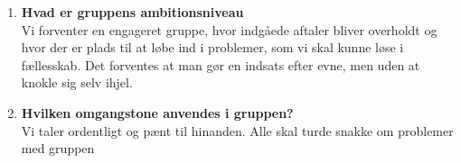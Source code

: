 \begin{enumerate}
	\item \textbf{Hvad er gruppens ambitionsniveau} \\
	Vi forventer en engageret gruppe, hvor indgåede aftaler bliver overholdt og hvor der er plads til at løbe ind i problemer, som vi skal kunne løse i fællesskab.
	Det forventes at man gør en indsats efter evne, men uden at knokle sig selv ihjel.
	\vspace{1cm}
	
	\item \textbf{Hvilken omgangstone anvendes i gruppen?}\\
	Vi taler ordentligt og pænt til hinanden. Alle skal turde snakke om problemer med gruppen
	\vspace{1cm}
	
\end{enumerate}
